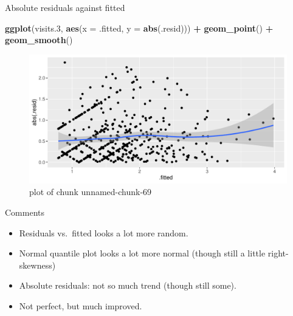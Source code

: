 \documentclass[ignorenonframetext,]{beamer}
\newenvironment{Shaded}{\begin{snugshade}}{\end{snugshade}}
\newcommand{\DataTypeTok}[1]{\textcolor[rgb]{0.13,0.29,0.53}{#1}}
\newcommand{\FloatTok}[1]{\textcolor[rgb]{0.00,0.00,0.81}{#1}}
\newcommand{\KeywordTok}[1]{\textcolor[rgb]{0.13,0.29,0.53}{\textbf{#1}}}
\newcommand{\NormalTok}[1]{#1}
\newcommand{\OperatorTok}[1]{\textcolor[rgb]{0.81,0.36,0.00}{\textbf{#1}}}
\newcommand{\StringTok}[1]{\textcolor[rgb]{0.31,0.60,0.02}{#1}}
\begin{document}
\begin{frame}[fragile]{Absolute residuals against fitted}
\protect\hypertarget{absolute-residuals-against-fitted}{}

\begin{Shaded}
\begin{Highlighting}[]
\KeywordTok{ggplot}\NormalTok{(visits}\FloatTok{.3}\NormalTok{, }\KeywordTok{aes}\NormalTok{(}\DataTypeTok{x =}\NormalTok{ .fitted, }\DataTypeTok{y =} \KeywordTok{abs}\NormalTok{(.resid))) }\OperatorTok{+}
\StringTok{  }\KeywordTok{geom_point}\NormalTok{() }\OperatorTok{+}\StringTok{ }\KeywordTok{geom_smooth}\NormalTok{()}
\end{Highlighting}
\end{Shaded}

\begin{figure}
\centering
\includegraphics{figure/unnamed-chunk-69-1.pdf}
\caption{plot of chunk unnamed-chunk-69}
\end{figure}

\end{frame}

\begin{frame}{Comments}
\protect\hypertarget{comments-7}{}

\begin{itemize}
\item
  Residuals vs.~fitted looks a lot more random.
\item
  Normal quantile plot looks a lot more normal (though still a little
  right-skewness)
\item
  Absolute residuals: not so much trend (though still some).
\item
  Not perfect, but much improved.
\end{itemize}

\end{frame}
\end{document}
